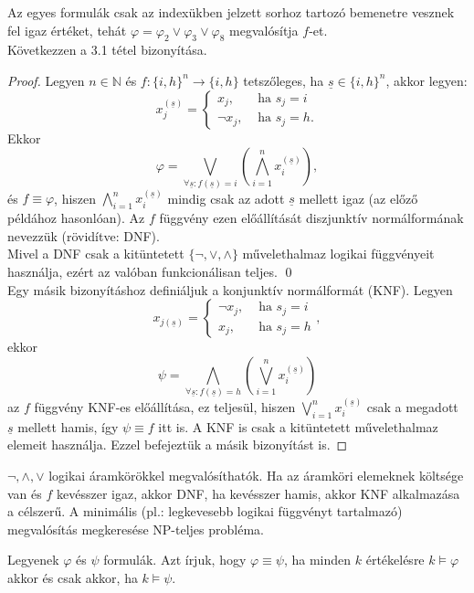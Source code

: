 Az egyes formulák csak az indexükben jelzett sorhoz tartozó bemenetre vesznek fel igaz értéket, tehát $\varphi = \varphi_2 \lor \varphi_3 \lor \varphi_8$ megvalósítja $f$-et. \\
\indent Következzen a 3.1 tétel bizonyítása.
\begin{proof}
Legyen $n \in \mathbb{N}$ és $f: \lbrace i, h \rbrace^n \rightarrow \lbrace i, h \rbrace$ tetszőleges, ha $\underline{s} \in \lbrace i, h \rbrace ^n$, akkor legyen:
$$
x_j^{(\underline{s})} =
\begin{cases}
x_j, & \text{ ha $s_j = i$} \\
\lnot x_j, & \text{ ha $s_j = h$}.
\end{cases}
$$
Ekkor
$$\varphi = \bigvee_{\forall \underline{s} : f(\underline{s}) = i} \left( \bigwedge^n_{i=1} x^{(\underline{s})}_i \right),$$
és $f \equiv \varphi$, hiszen $\bigwedge^n_{i=1} x^{(\underline{s})}_i$ mindig csak az adott $\underline{s}$ mellett igaz (az előző példához hasonlóan). Az $f$ függvény ezen előállítását diszjunktív normálformának nevezzük (rövidítve: DNF). \\
\indent Mivel a DNF csak a kitüntetett $\lbrace \lnot, \lor, \land \rbrace$ művelethalmaz logikai függvényeit használja, ezért az valóban funkcionálisan teljes. \qed \\
\indent Egy másik bizonyításhoz definiáljuk a konjunktív normálformát (KNF). Legyen
$$
x_{j(\underline{s})} =
\begin{cases}
\lnot x_j, & \text{ ha $s_j = i$} \\
x_j, & \text{ ha $s_j = h$}
\end{cases},
$$
ekkor
$$\psi = \bigwedge_{\forall \underline{s} : f(\underline{s}) = h} \left( \bigvee^n_{i=1} x^{(\underline{s})}_i \right)$$
az $f$ függvény KNF-es előállítása, ez teljesül, hiszen $\bigvee^n_{i=1} x^{(\underline{s})}_i$ csak a megadott $\underline{s}$ mellett hamis, így $\psi \equiv f$ itt is. A KNF is csak a kitüntetett művelethalmaz elemeit használja. Ezzel befejeztük a másik bizonyítást is.
\end{proof}
\begin{megj}
$\lnot, \land, \lor$ logikai áramkörökkel megvalósíthatók. Ha az áramköri elemeknek költsége van és $f$ kevésszer igaz, akkor DNF, ha kevésszer hamis, akkor KNF alkalmazása a célszerű. A minimális (pl.: legkevesebb logikai függvényt tartalmazó) megvalósítás megkeresése NP-teljes probléma.
\end{megj}
\begin{defi} Legyenek $\varphi$ és $\psi$ formulák. Azt írjuk, hogy $\varphi \equiv \psi$, ha minden $k$ értékelésre $k \models \varphi$ akkor és csak akkor, ha $k \models \psi$.
\end{defi}
